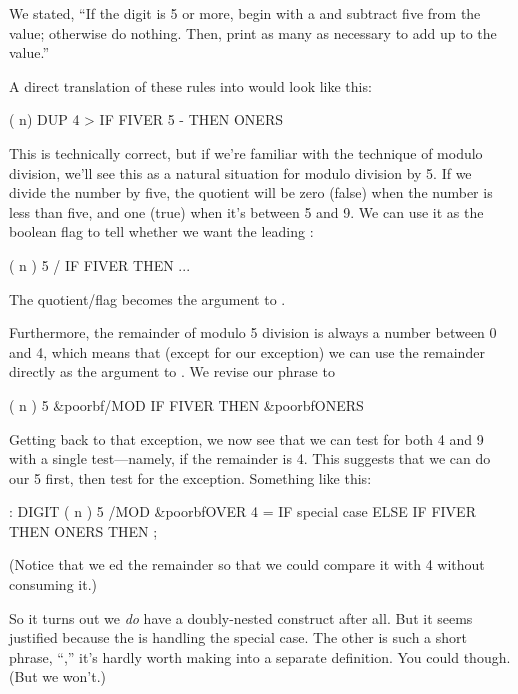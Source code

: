 We stated, ``If the digit is 5 or more, begin with a  and
subtract five from the value; otherwise do nothing. Then, print as many
 as necessary to add up to the value.''

A direct translation of these rules into \Forth{} would look like this:

\begin{Code}
( n)  DUP  4 > IF  FIVER 5 -  THEN  ONERS
\end{Code}
This is technically correct, but if we're familiar with the technique of
modulo division, we'll see this as a natural situation for modulo division
by 5. If we divide the number by five, the quotient will be zero (false)
when the number is less than five, and one (true) when it's between 5 and
9. We can use it as the boolean flag to tell whether we want the leading
:

\begin{Code}
( n )  5 / IF FIVER THEN ...
\end{Code}
The quotient/flag becomes the argument to .

Furthermore, the remainder of modulo 5 division is always a number between
0 and 4, which means that (except for our exception) we can use the
remainder directly as the argument to . We revise our phrase
to

\begin{Code}[commandchars=\&\{\}]
( n )  5 &poorbf{/MOD} IF FIVER THEN  &poorbf{ONERS}
\end{Code}
Getting back to that exception, we now see that we can test for both 4 and
9 with a single test---namely, if the remainder is 4. This suggests that
we can do our 5  first, then test for the exception.
Something like this:

\begin{Code}[commandchars=\&\{\}]
: DIGIT  ( n )
     5 /MOD  &poorbf{OVER 4 =  IF  special case  ELSE}
     IF FIVER THEN  ONERS  THEN ;
\end{Code}
(Notice that we ed the remainder so that we could compare it with
4 without consuming it.)

So it turns out we \emph{do} have a doubly-nested 
construct after all. But it seems justified because the 
is handling the special case. The other is such a short phrase,
``,'' it's hardly worth making into a separate
definition. You could though. (But we won't.)

